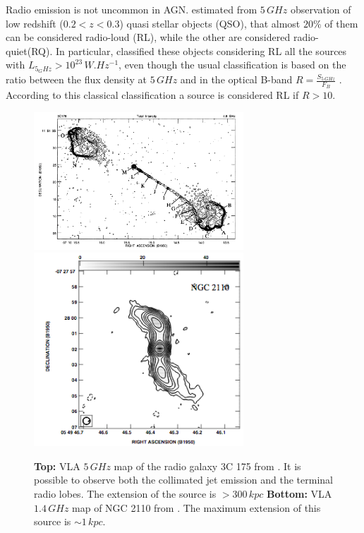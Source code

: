 \documentclass[../thesis.tex]{subfiles}
\begin{document}
Radio emission is not uncommon in AGN.
\citet{Kellermann16} estimated from $5\,\si{GHz}$ observation of low redshift ($0.2<z<0.3$) quasi stellar objects (QSO), that almost $20\%$ of them can be considered radio-loud (RL), while the other are considered radio-quiet(RQ).
In particular, \citet{Kellermann16} classified these objects considering RL all the sources with $L_{5_GHz}>10^{23}\,\si{W.Hz^{-1}}$, even though the usual classification is based on the ratio between the flux density at $5\,\si{GHz}$ and in the optical B-band $R=\frac{S_{5\,\si{GHz}}}{F_{B}}$ \citep{Kellermann89}.
According to this classical classification a source is considered RL if $R>10$.

\begin{figure}
\centering
\includegraphics[width=0.7\textwidth]{images/3c175.png} \\
\includegraphics[width=0.7\textwidth]{images/NGC2110.png}
\caption[]{\textbf{Top:} VLA $5\,\si{GHz}$ map of the radio galaxy 3C 175 from \citet{Bridle94}. It is possible to observe both the collimated jet emission and the terminal radio lobes. The extension of the source is $> 300\,\si{kpc}$ \textbf{Bottom:} VLA $1.4\,\si{GHz}$ map of NGC 2110 from \citet{Mundell09}. The maximum extension of this source is $\sim 1\,\si{kpc}$. }
\label{fig:radio_galaxies}
\end{figure}
\end{document}
